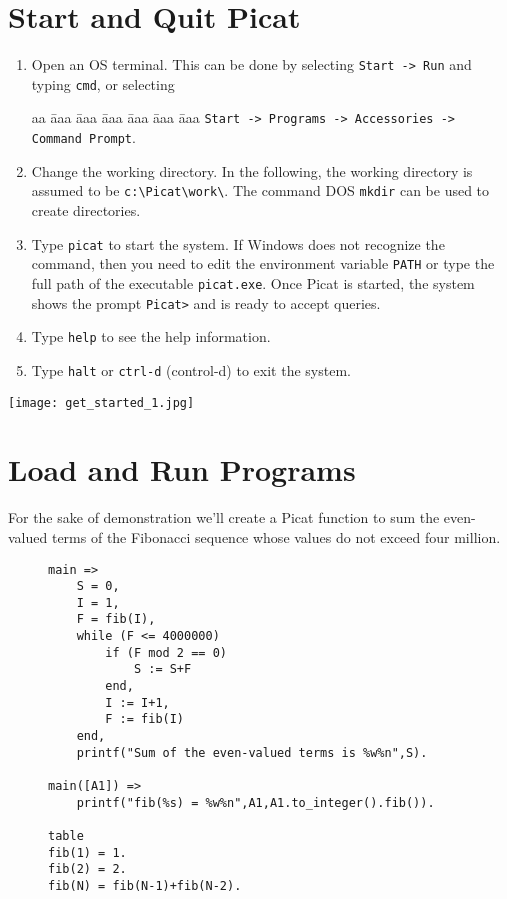 \documentclass{article}[12pt]
\begin{document}
\section*{\Large{Start and Quit Picat}}
\begin{enumerate}
\item Open an OS terminal. This can be done by selecting \verb+Start -> Run+ and typing \verb+cmd+, or selecting 
\begin{tabbing}
aa \= aaa \= aaa \= aaa \= aaa \= aaa \= aaa \kill
\> \> \verb+Start -> Programs -> Accessories -> Command Prompt+.  
\end{tabbing}

\item Change the working directory. In the following, the working directory is assumed to be \verb+c:\Picat\work\+. The command DOS \texttt{mkdir} can be used to create directories.

\item Type \verb+picat+ to start the system. If Windows does not recognize the command, then you need to edit the environment variable \texttt{PATH} or type the full path of the executable \verb+picat.exe+. Once Picat is started, the system shows the prompt \verb+Picat>+ and is ready to accept queries.

\item Type \texttt{help} to see the help information.

\item Type \texttt{halt} or \verb+ctrl-d+ (control-d) to exit the system.
\end{enumerate}

\texttt{[image: get\_started\_1.jpg]}

\section*{\Large{Load and Run Programs}} 
\indent For the sake of demonstration we'll create a Picat function to sum the
even-valued terms of the Fibonacci sequence whose values do not exceed four million.

\begin{figure}[htb]
\begin{verbatim} 
main =>
    S = 0,
    I = 1,
    F = fib(I),
    while (F <= 4000000)
        if (F mod 2 == 0) 
            S := S+F
        end,
        I := I+1,
        F := fib(I)
    end,
    printf("Sum of the even-valued terms is %w%n",S).
       
main([A1]) => 
    printf("fib(%s) = %w%n",A1,A1.to_integer().fib()).

table
fib(1) = 1.
fib(2) = 2.
fib(N) = fib(N-1)+fib(N-2).
\end{verbatim}
\end{figure}
\vspace*{-5mm}
\end{document}
